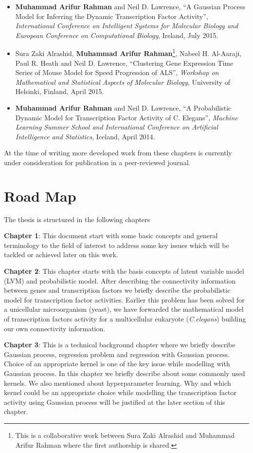 \begin{itemize}
\item \textbf{Muhammad Arifur Rahman} and Neil D. Lawrence, ``A Gaussian Process Model for Inferring the Dynamic Transcription Factor Activity'', \textit{International Conference on Intelligent Systems for Molecular Biology and European Conference on Computational Biology}, Ireland, July 2015. 
\item Sura Zaki Alrashid, \textbf{Muhammad Arifur Rahman}\footnote{This is a collaborative work between Sura Zaki Alrashid and Muhammad Arifur Rahman where the first authorship is shared. }, Nabeel H. Al-Aaraji, Paul R. Heath and Neil D. Lawrence, ``Clustering Gene Expression Time Series of Mouse Model for Speed Progression of ALS'', \textit{Workshop on Mathematical and Statistical Aspects of Molecular Biology}, University of Helsinki, Finland, April 2015.
\item \textbf{Muhammad Arifur Rahman} and Neil D. Lawrence, ``A Probabilistic Dynamic Model for Transcription Factor Activity of C. Elegans'', \textit{Machine Learning Summer School and  International Conference on Artificial Intelligence and Statistics}, Iceland, April 2014.
\end{itemize}

At the time of writing more developed work from these chapters is currently under consideration for publication in a peer-reviewed journal.

\section{Road Map}
The thesis is structured in the following chapters

\textbf{Chapter 1}: This document start with some basic concepts and general terminology to the field of interest to address some key issues which will be tackled or achieved later on this work.

\textbf{Chapter 2}: This chapter starts with the basis concepts of latent variable model (LVM) and probabilistic model. After describing the connectivity information between genes and transcription factors we briefly describe the probabilistic model for transcription factor activities. Earlier this problem has been solved for a unicellular microorganism (yeast), we have forwarded the mathematical model of transcription factors activity for a multicellular eukaryote (\textit{C.elegans}) building our own connectivity information.
 
\textbf{Chapter 3}: This is a technical background chapter where we briefly describe Gaussian process, regression problem and regression with Gaussian process. Choice of an appropriate kernel is one of the key issue while modelling with Gaussian process. In this chapter we briefly describe about some commonly used kernels. We also mentioned about hyperparameter learning. Why and which kernel could be an appropriate choice while modelling the transcription factor activity using Gaussian process will be justified at the later section of this chapter.

